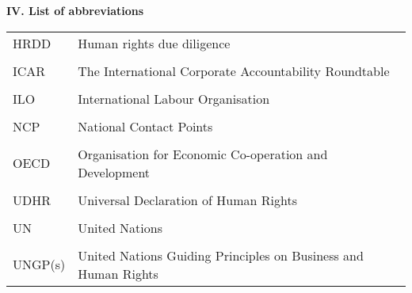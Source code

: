 \thispagestyle{plain}
\linespread{1.25}
\textbf{IV. List of abbreviations}

\begin{flushleft}
\begin{table}[h]
\begin{tabular}{ll}
HRDD    & Human rights due diligence                                     \\ \\[-1em]
ICAR    & The International Corporate Accountability Roundtable          \\ \\[-1em]
ILO     & International Labour Organisation                              \\ \\[-1em]
NCP     & National Contact Points                                        \\ \\[-1em]
OECD    & Organisation for Economic Co-operation and Development         \\ \\[-1em]
UDHR    & Universal Declaration of Human Rights                          \\ \\[-1em]
UN      & United Nations                                                 \\ \\[-1em]
UNGP(s) & United Nations Guiding Principles on Business and Human Rights
\end{tabular}
\end{table}
\end{flushleft}
